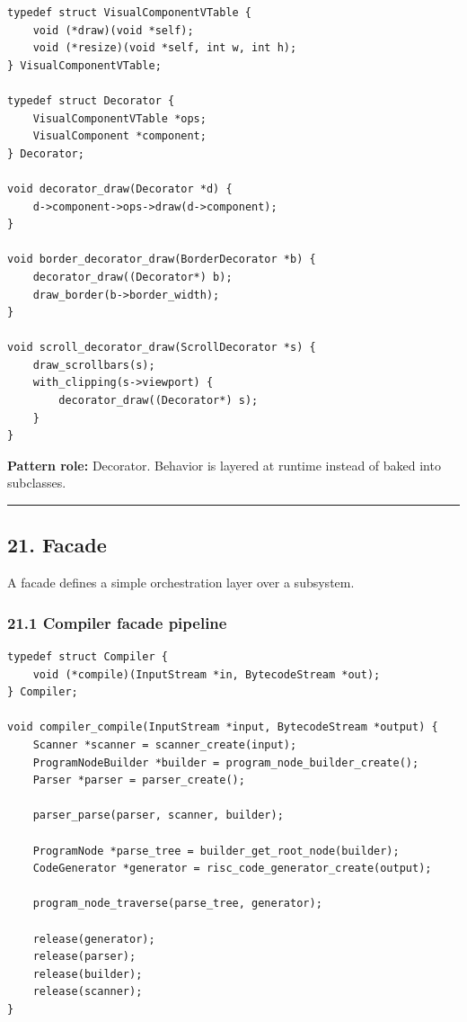 \documentclass[11pt]{article}
\begin{document}
\begin{verbatim}
typedef struct VisualComponentVTable {
    void (*draw)(void *self);
    void (*resize)(void *self, int w, int h);
} VisualComponentVTable;

typedef struct Decorator {
    VisualComponentVTable *ops;
    VisualComponent *component;
} Decorator;

void decorator_draw(Decorator *d) {
    d->component->ops->draw(d->component);
}

void border_decorator_draw(BorderDecorator *b) {
    decorator_draw((Decorator*) b);
    draw_border(b->border_width);
}

void scroll_decorator_draw(ScrollDecorator *s) {
    draw_scrollbars(s);
    with_clipping(s->viewport) {
        decorator_draw((Decorator*) s);
    }
}
\end{verbatim}

\textbf{Pattern role:} Decorator. Behavior is layered at runtime instead of baked into subclasses.

\begin{center}\rule{0.5\linewidth}{0.5pt}\end{center}

\subsection{21. Facade}\label{facade}

A facade defines a simple orchestration layer over a subsystem.

\subsubsection{21.1 Compiler facade pipeline}\label{compiler-facade-pipeline}

\begin{verbatim}
typedef struct Compiler {
    void (*compile)(InputStream *in, BytecodeStream *out);
} Compiler;

void compiler_compile(InputStream *input, BytecodeStream *output) {
    Scanner *scanner = scanner_create(input);
    ProgramNodeBuilder *builder = program_node_builder_create();
    Parser *parser = parser_create();

    parser_parse(parser, scanner, builder);

    ProgramNode *parse_tree = builder_get_root_node(builder);
    CodeGenerator *generator = risc_code_generator_create(output);

    program_node_traverse(parse_tree, generator);

    release(generator);
    release(parser);
    release(builder);
    release(scanner);
}
\end{verbatim}
\end{document}
